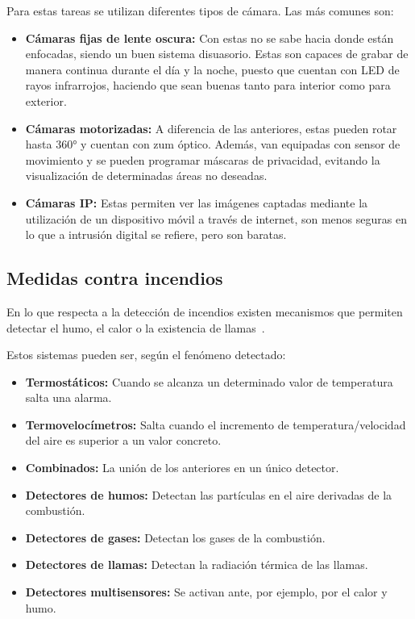 Para estas tareas se utilizan diferentes tipos de cámara. Las más comunes son:
\begin{itemize}
	\item \textbf{Cámaras fijas de lente oscura:} Con estas no se sabe hacia donde están enfocadas, siendo un buen sistema disuasorio. Estas son capaces de grabar de manera continua durante el día y la noche, puesto que cuentan con LED de rayos infrarrojos, haciendo que sean buenas tanto para interior como para exterior.
	\item \textbf{Cámaras motorizadas:} A diferencia de las anteriores, estas pueden rotar hasta 360° y cuentan con zum óptico. Además, van equipadas con sensor de movimiento y se pueden programar máscaras de privacidad, evitando la visualización de determinadas áreas no deseadas.
	\item \textbf{Cámaras IP:} Estas permiten ver las imágenes captadas mediante la utilización de un dispositivo móvil a través de internet, son menos seguras en lo que a intrusión digital se refiere, pero son baratas.
\end{itemize}

\subsection{Medidas contra incendios}\label{subsec:medidas-contra-incendios}
En lo que respecta a la detección de incendios existen mecanismos que permiten detectar el humo, el calor o la existencia de llamas~\cite{microsegur_que_2021}.

Estos sistemas pueden ser, según el fenómeno detectado:
\begin{itemize}
	\item \textbf{Termostáticos:} Cuando se alcanza un determinado valor de temperatura salta una alarma.
	\item \textbf{Termovelocímetros:} Salta cuando el incremento de temperatura/velocidad del aire es superior a un valor concreto.
	\item \textbf{Combinados:} La unión de los anteriores en un único detector.
	\item \textbf{Detectores de humos:} Detectan las partículas en el aire derivadas de la combustión.
	\item \textbf{Detectores de gases:} Detectan los gases de la combustión.
	\item \textbf{Detectores de llamas:} Detectan la radiación térmica de las llamas.
	\item \textbf{Detectores multisensores:} Se activan ante, por ejemplo, por el calor y humo.
\end{itemize}

